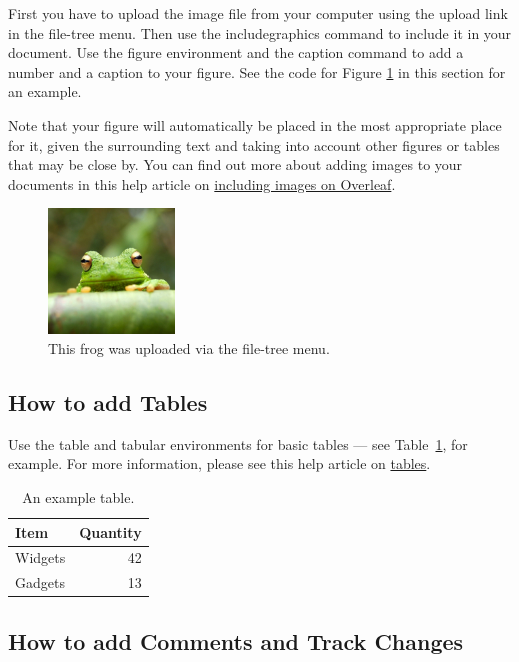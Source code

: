 \documentclass{article}
\begin{document}
First you have to upload the image file from your computer using the upload link in the file-tree menu. Then use the includegraphics command to include it in your document. Use the figure environment and the caption command to add a number and a caption to your figure. See the code for Figure \ref{fig:frog} in this section for an example.

Note that your figure will automatically be placed in the most appropriate place for it, given the surrounding text and taking into account other figures or tables that may be close by. You can find out more about adding images to your documents in this help article on \href{https://www.overleaf.com/learn/how-to/Including_images_on_Overleaf}{including images on Overleaf}.

\begin{figure}
\centering
\includegraphics[width=0.3\textwidth]{frog.jpg}
\caption{\label{fig:frog}This frog was uploaded via the file-tree menu.}
\end{figure}

\subsection{How to add Tables}

Use the table and tabular environments for basic tables --- see Table~\ref{tab:widgets}, for example. For more information, please see this help article on \href{https://www.overleaf.com/learn/latex/tables}{tables}. 

\begin{table}
\centering
\begin{tabular}{l|r}
Item & Quantity \\\hline
Widgets & 42 \\
Gadgets & 13
\end{tabular}
\caption{\label{tab:widgets}An example table.}
\end{table}

\subsection{How to add Comments and Track Changes}
\end{document}

